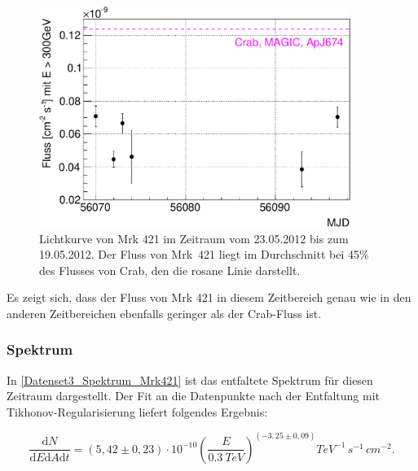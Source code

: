 \begin{figure}
    \centering
    \includegraphics[width=0.9\textwidth]{./Plots/04_MrkAnalyse/Datenset3/Datenset3_Mrk421_LC.pdf}
    \caption{Lichtkurve von Mrk 421 im Zeitraum vom 23.05.2012 bis zum 19.05.2012.
    Der Fluss von Mrk~421 liegt im Durchschnitt bei 45\% des Flusses von Crab, den die rosane Linie darstellt.}
    \label{Datenset3_LC_Mrk421}
\end{figure}

Es zeigt sich, dass der Fluss von Mrk 421 in diesem Zeitbereich genau wie in den anderen Zeitbereichen ebenfalls geringer als der Crab-Fluss ist.


\subsubsection{Spektrum}

In \autoref{Datenset3_Spektrum_Mrk421} ist das entfaltete Spektrum für diesen Zeitraum dargestellt.
Der Fit an die Datenpunkte nach der Entfaltung mit Tikhonov-Regularisierung liefert folgendes Ergebnis:

\begin{equation}
 \frac{\mathrm{d}N}{\mathrm{d}E\mathrm{d}A\mathrm{d}t}=(5,42 \pm 0,23) \cdot 10^{-10}\left( \frac{E}{\SI{0,3}{TeV}} \right)^{(-3,25 \pm 0,09)} \si{TeV^{-1}\,s^{-1}\,cm^{-2}}.
\end{equation}

